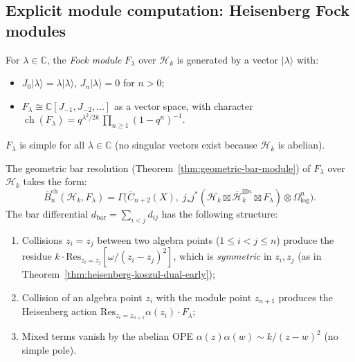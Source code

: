 \subsection{Explicit module computation: Heisenberg Fock modules}

\begin{definition}\label{def:fock-module}
For $\lambda \in \mathbb{C}$, the \emph{Fock module}
$F_\lambda$ over $\mathcal{H}_k$ is generated by a vector
$|\lambda\rangle$ with:
\begin{itemize}
\item $J_0|\lambda\rangle = \lambda|\lambda\rangle$,\quad
  $J_n|\lambda\rangle = 0$ for $n > 0$;
\item $F_\lambda \cong \mathbb{C}[J_{-1}, J_{-2}, \ldots]$ as a
  vector space, with character
  $\operatorname{ch}(F_\lambda) = q^{\lambda^2/2k}\,
  \prod_{n \geq 1}(1-q^n)^{-1}$.
\end{itemize}
$F_\lambda$ is simple for all $\lambda \in \mathbb{C}$
(no singular vectors exist because $\mathcal{H}_k$ is abelian).
\end{definition}

\begin{proposition}
\label{prop:fock-bar-resolution}
The geometric bar resolution
(Theorem~\ref{thm:geometric-bar-module}) of $F_\lambda$ over
$\mathcal{H}_k$ takes the form:
\begin{equation}\label{eq:fock-bar-resolution}
\overline{B}_n^{\mathrm{ch}}(\mathcal{H}_k, F_\lambda)
= \Gamma\bigl(\overline{C}_{n+2}(X),\;
j_*j^*(\mathcal{H}_k \boxtimes \overline{\mathcal{H}}_k^{\boxtimes n}
\boxtimes F_\lambda) \otimes \Omega^n_{\log}\bigr).
\end{equation}
The bar differential $d_{\mathrm{bar}} = \sum_{i<j} d_{ij}$ has the
following structure:
\begin{enumerate}[label=\textup{(\roman*)}]
\item Collisions $z_i = z_j$ between two algebra points
  ($1 \leq i < j \leq n$) produce the residue
  $k \cdot \mathrm{Res}_{z_i = z_j}[\omega/(z_i - z_j)^2]$,
  which is \emph{symmetric} in $z_i, z_j$ (as in
  Theorem~\textup{\ref{thm:heisenberg-koszul-dual-early})};
\item Collision of an algebra point $z_i$ with the module point
  $z_{n+1}$ produces the Heisenberg action
  $\mathrm{Res}_{z_i = z_{n+1}} \alpha(z_i) \cdot F_\lambda$;
\item Mixed terms vanish by the abelian OPE
  $\alpha(z)\alpha(w) \sim k/(z-w)^2$ (no simple pole).
\end{enumerate}
\end{proposition}

